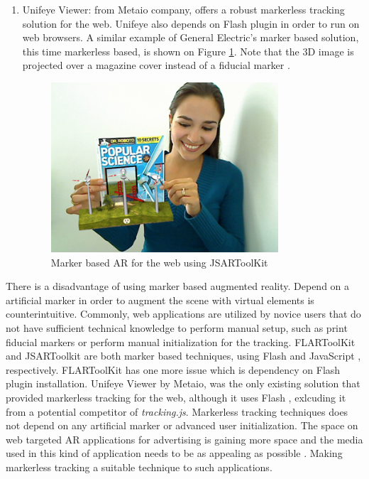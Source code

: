 \begin{enumerate}
    \item Unifeye Viewer: from Metaio company, offers a robust markerless tracking solution for the web. Unifeye \cite{Metaio2009} also depends on Flash \cite{Flash2013} plugin in order to run on web browsers. A similar example of General Electric's marker based solution, this time markerless based, is shown on Figure \ref{figure:unifeyeviewer}. Note that the 3D image is projected over a magazine cover instead of a fiducial marker \cite{Cho1998}.

    \begin{figure}[!htb]
      \centering
      \includegraphics[width=240pt]{chapters/computer_vision_library_for_the_web/unifeyeviewer.png}
      \caption{Marker based AR for the web using JSARToolKit}
      \label{figure:unifeyeviewer}
    \end{figure}
\end{enumerate}

There is a disadvantage of using marker based augmented reality. Depend on a artificial marker in order to augment the scene with virtual elements is counterintuitive. Commonly, web applications are utilized by novice users that do not have sufficient technical knowledge to perform manual setup, such as print fiducial markers or perform manual initialization for the tracking. FLARToolKit \cite{Yan2011} and JSARToolkit \cite{JSARToolkit2011} are both marker based techniques, using Flash \cite{Flash2013} and JavaScript \cite{International2009}, respectively. FLARToolKit has one more issue which is dependency on Flash \cite{Flash2013} plugin installation. Unifeye Viewer by Metaio, was the only existing solution that provided markerless tracking for the web, although it uses Flash \cite{Flash2013}, exlcuding it from a potential competitor of \textit{tracking.js}. Markerless tracking techniques does not depend on any artificial marker or advanced user initialization. The space on web targeted AR applications for advertising is gaining more space and the media used in this kind of application needs to be as appealing as possible \cite{Pablo2013}. Making markerless tracking a suitable technique to such applications.

